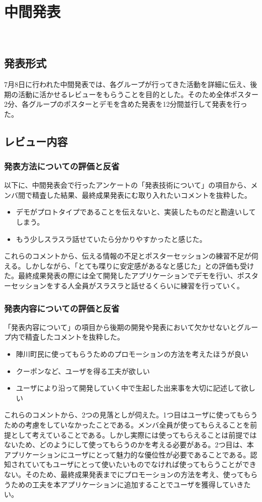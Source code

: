 \chapter{中間発表}
​
\section{発表形式}
7月8日に行われた中間発表では、各グループが行ってきた活動を詳細に伝え、後期の活動に活かせるレビューをもらうことを目的とした。そのため全体ポスター2分、各グループのポスターとデモを含めた発表を12分間並行して発表を行った。

\section{レビュー内容}%
\subsection{発表方法についての評価と反省}%
以下に、中間発表会で行ったアンケートの「発表技術について」の項目から、メンバ間で精査した結果、最終成果発表にむ取り入れたいコメントを抜粋した。
\begin{itemize}
  \item デモがプロトタイプであることを伝えないと、実装したものだと勘違いしてしまう。
  \item もう少しスラスラ話せていたら分かりやすかったと感じた。
\end{itemize}
    これらのコメントから、伝える情報の不足とポスターセッションの練習不足が伺える。しかしながら、「とても喋りに安定感があるなと感じた」との評価も受けた。最終成果発表の際には全て開発したアプリケーションでデモを行い、ポスターセッションをする人全員がスラスラと話せるくらいに練習を行っていく。

\subsection{発表内容についての評価と反省}
    「発表内容について」の項目から後期の開発や発表において欠かせないとグループ内で精査したコメントを抜粋した。
\begin{itemize}
  \item 陣川町民に使ってもらうためのプロモーションの方法を考えたほうが良い
  \item クーポンなど、ユーザを得る工夫が欲しい
  \item ユーザにより沿って開発していく中で生起した出来事を大切に記述して欲しい
\end{itemize}
    これらのコメントから、2つの見落としが伺えた。1つ目はユーザに使ってもらうための考慮をしていなかったことである。メンバ全員が使ってもらえることを前提として考えていることである。しかし実際には使ってもらえることは前提ではないため、どのようにして使ってもらうのかを考える必要がある。2つ目は、本アプリケーションにユーザにとって魅力的な優位性が必要であることである。認知されていてもユーザにとって使いたいものでなければ使ってもらうことができない。そのため、最終成果発表までにプロモーションの方法を考え、使ってもらうための工夫を本アプリケーションに追加することでユーザを獲得していきたい。
